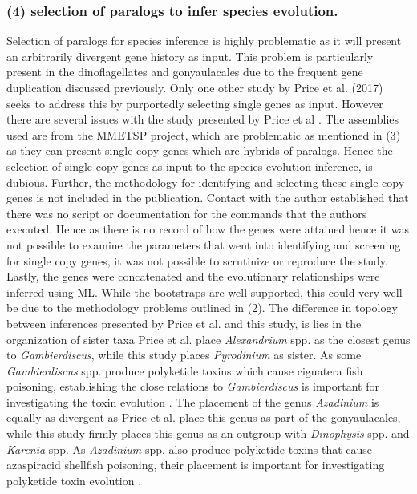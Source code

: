 \documentclass[12pt]{article}
\begin{document}
\subsubsection*{(4) selection of paralogs to infer species evolution.}
Selection of paralogs for species inference is highly problematic as it will present an arbitrarily divergent gene history as input. 
This problem is particularly present in the dinoflagellates and gonyaulacales due to the frequent gene duplication discussed previously. %
Only one other study by Price et al. (2017) seeks to address this by purportedly selecting single genes as input. 
However there are several issues with the study presented by Price et al \cite{price2017robust}. 
The assemblies used are from the MMETSP project, which are problematic as mentioned in (3) as they can present single copy genes which are hybrids of paralogs. 
Hence the selection of single copy genes as input to the species evolution inference, is dubious. 
Further, the methodology for identifying and selecting these single copy genes is not included in the publication. 
Contact with the author established that there was no script or documentation for the commands that the authors executed. 
Hence as there is no record of how the genes were attained hence it was not possible to examine the parameters that went into identifying and screening for single copy genes, it was not possible to scrutinize or reproduce the study.
Lastly, the genes were concatenated and the evolutionary relationships were inferred using ML. While the bootstraps are well supported, this could very well be due to the methodology problems outlined in (2).
The difference in topology between inferences presented by Price et al. and this study, is lies in the organization of sister taxa %
Price et al. place \emph{Alexandrium} spp. as the closest genus to \emph{Gambierdiscus}, while this study places \emph{Pyrodinium} as sister. 
As some \emph{Gambierdiscus} spp. produce polyketide toxins which cause ciguatera fish poisoning, establishing the close relations to \emph{Gambierdiscus} is important for investigating the toxin evolution \cite{pawlowiez2014transcriptome}.
The placement of the genus \emph{Azadinium} is equally as divergent as Price et al. place this genus as part of the gonyaulacales, while this study firmly places this genus as an outgroup with \emph{Dinophysis} spp. and \emph{Karenia} spp.
As \emph{Azadinium} spp. also produce polyketide toxins that cause azaspiracid shellfish poisoning, their placement is important for investigating polyketide toxin evolution \cite{meyer2015transcriptomic}.
\end{document}
